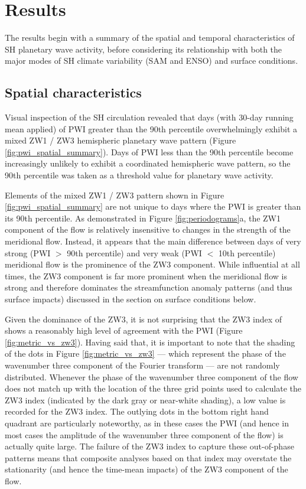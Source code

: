 \section{Results}

The results begin with a summary of the spatial and temporal characteristics of SH planetary wave activity, before considering its relationship with both the major modes of SH climate variability (SAM and ENSO) and surface conditions. 

\subsection{Spatial characteristics}\label{s:spatial_characteristics}

Visual inspection of the SH circulation revealed that days (with 30-day running mean applied) of PWI greater than the 90th percentile overwhelmingly exhibit a mixed ZW1 / ZW3 hemispheric planetary wave pattern (Figure \ref{fig:pwi_spatial_summary}). Days of PWI less than the 90th percentile become increasingly unlikely to exhibit a coordinated hemispheric wave pattern, so the 90th percentile was taken as a threshold value for planetary wave activity. 

Elements of the mixed ZW1 / ZW3 pattern shown in Figure \ref{fig:pwi_spatial_summary} are not unique to days where the PWI is greater than its 90th percentile. As demonstrated in Figure \ref{fig:periodograms}a, the ZW1 component of the flow is relatively insensitive to changes in the strength of the meridional flow. Instead, it appears that the main difference between days of very strong (PWI $>$ 90th percentile) and very weak (PWI $<$ 10th percentile) meridional flow is the prominence of the ZW3 component. While influential at all times, the ZW3 component is far more prominent when the meridional flow is strong and therefore dominates the streamfunction anomaly patterns (and thus surface impacts) discussed in the section on surface conditions below. 

Given the dominance of the ZW3, it is not surprising that the ZW3 index of \citet{Raphael2004} shows a reasonably high level of agreement with the PWI (Figure \ref{fig:metric_vs_zw3}). Having said that, it is important to note that the shading of the dots in Figure \ref{fig:metric_vs_zw3} --- which represent the phase of the wavenumber three component of the Fourier transform --- are not randomly distributed. Whenever the phase of the wavenumber three component of the flow does not match up with the location of the three grid points used to calculate the ZW3 index (indicated by the dark gray or near-white shading), a low value is recorded for the ZW3 index. The outlying dots in the bottom right hand quadrant are particularly noteworthy, as in these cases the PWI (and hence in most cases the amplitude of the wavenumber three component of the flow) is actually quite large. The failure of the ZW3 index to capture these out-of-phase patterns means that composite analyses based on that index may overstate the stationarity (and hence the time-mean impacts) of the ZW3 component of the flow.
    
    
  
  